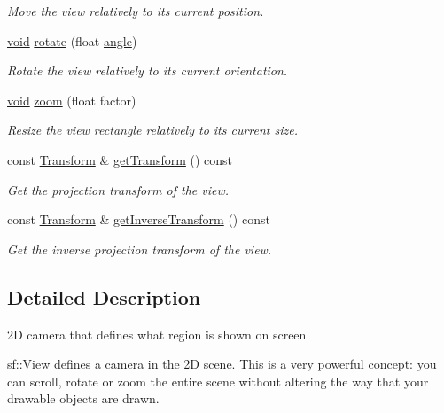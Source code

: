 \begin{DoxyCompactItemize}
\begin{DoxyCompactList}\small\item\em Move the view relatively to its current position. \end{DoxyCompactList}\item 
\hyperlink{glutf90_8h_ac778d6f63f1aaf8ebda0ce6ac821b56e}{void} \hyperlink{classsf_1_1_view_a5fd3901aae1845586ca40add94faa378}{rotate} (float \hyperlink{_vector3_8h_abd17f37dc7bb5b2bd9a569193ebcdda4}{angle})
\begin{DoxyCompactList}\small\item\em Rotate the view relatively to its current orientation. \end{DoxyCompactList}\item 
\hyperlink{glutf90_8h_ac778d6f63f1aaf8ebda0ce6ac821b56e}{void} \hyperlink{classsf_1_1_view_a4a72a360a5792fbe4e99cd6feaf7726e}{zoom} (float factor)
\begin{DoxyCompactList}\small\item\em Resize the view rectangle relatively to its current size. \end{DoxyCompactList}\item 
const \hyperlink{classsf_1_1_transform}{Transform} \& \hyperlink{classsf_1_1_view_a0109dba48aee769126f670a212b3ed7f}{get\-Transform} () const 
\begin{DoxyCompactList}\small\item\em Get the projection transform of the view. \end{DoxyCompactList}\item 
const \hyperlink{classsf_1_1_transform}{Transform} \& \hyperlink{classsf_1_1_view_ae7643324b2d8807cf0d9efe9dadfc8cc}{get\-Inverse\-Transform} () const 
\begin{DoxyCompactList}\small\item\em Get the inverse projection transform of the view. \end{DoxyCompactList}\end{DoxyCompactItemize}


\subsection{Detailed Description}
2\-D camera that defines what region is shown on screen 

\hyperlink{classsf_1_1_view}{sf\-::\-View} defines a camera in the 2\-D scene. This is a very powerful concept\-: you can scroll, rotate or zoom the entire scene without altering the way that your drawable objects are drawn.

